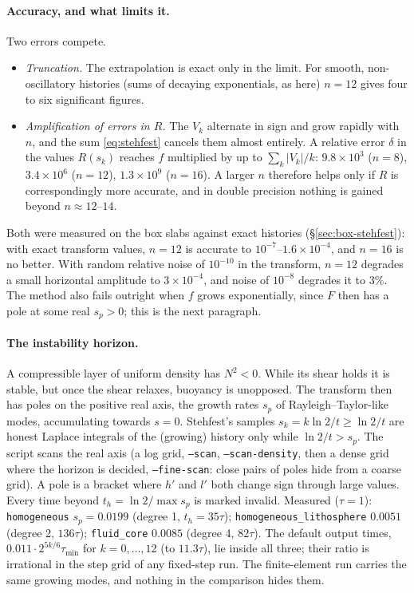 \documentclass[11pt]{article}
\numberwithin{equation}{section}
\newcommand{\code}[1]{\texttt{#1}}
\begin{document}
\paragraph{Accuracy, and what limits it.}
Two errors compete.
\begin{itemize}[leftmargin=*]
\item \emph{Truncation.} The extrapolation is exact only in the limit.
  For smooth, non-oscillatory histories (sums of decaying exponentials,
  as here) $n=12$ gives four to six significant figures.
\item \emph{Amplification of errors in $R$.} The $V_k$ alternate in sign
  and grow rapidly with $n$, and the sum \eqref{eq:stehfest} cancels them
  almost entirely. A relative error $\delta$ in the values $R(s_k)$
  reaches $f$ multiplied by up to $\sum_k|V_k|/k$: $9.8\times10^3$
  ($n=8$), $3.4\times10^6$ ($n=12$), $1.3\times10^9$ ($n=16$). A larger
  $n$ therefore helps only if $R$ is correspondingly more accurate, and in
  double precision nothing is gained beyond $n\approx12$--$14$.
\end{itemize}
Both were measured on the box slabs against exact histories
(\S\ref{sec:box-stehfest}): with exact transform values, $n=12$ is
accurate to $10^{-7}$--$1.6\times10^{-4}$, and $n=16$ is no better. With
random relative noise of $10^{-10}$ in the transform, $n=12$ degrades a
small horizontal amplitude to $3\times10^{-4}$, and noise of $10^{-8}$
degrades it to $3\%$. The method also fails outright when $f$ grows
exponentially, since $F$ then has a pole at some real $s_p>0$; this is
the next paragraph.

\paragraph{The instability horizon.}
A compressible layer of uniform density has $N^2<0$. While its shear holds
it is stable, but once the shear relaxes, buoyancy is unopposed. The
transform then has poles on the positive real axis, the growth rates
$s_p$ of Rayleigh--Taylor-like modes, accumulating towards $s=0$.
Stehfest's samples $s_k=k\ln2/t\ge\ln 2/t$ are honest Laplace integrals of
the (growing) history only while $\ln2/t>s_p$. The script scans the real
axis (a log grid, \code{--scan}, \code{--scan-density}, then a dense grid
where the horizon is decided, \code{--fine-scan}: close pairs of poles hide
from a coarse grid). A pole is a bracket where $h'$ and $l'$ both change
sign through large values. Every time beyond $t_h=\ln2/\max s_p$ is marked
invalid. Measured ($\tau=1$): \code{homogeneous} $s_p=0.0199$ (degree 1,
$t_h=35\tau$); \code{homogeneous\_lithosphere} $0.0051$ (degree 2,
$136\tau$); \code{fluid\_core} $0.0085$ (degree 4, $82\tau$). The default
output times, $0.011\cdot2^{5k/6}\tau_{\min}$ for $k=0,\dots,12$ (to
$11.3\tau$), lie inside all three; their ratio is irrational in the step
grid of any fixed-step run. The finite-element run carries the same
growing modes, and nothing in the comparison hides them.
\end{document}
